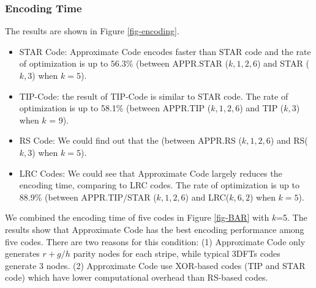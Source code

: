 \documentclass[sigconf]{acmart}
\begin{document}
\subsubsection{Encoding Time}
The results are shown in Figure \ref{fig-encoding}.
\begin{itemize}
    \item STAR Code: Approximate Code encodes faster than STAR code and the rate of optimization is up to $56.3\%$ (between APPR.STAR ($k,1,2,6$) and STAR ($k,3$) when $k = 5$).

    \item TIP-Code: the result of TIP-Code is similar to STAR code. The rate of optimization is up to 58.1\% (between APPR.TIP ($k,1,2,6$) and TIP ($k,3$) when $k$ = 9).

    \item RS Code: We could find out that the  (between APPR.RS ($k,1,2,6$) and RS($k,3$) when $k = 5$).

    \item LRC Codes: We could see that Approximate Code largely reduces the encoding time, comparing to LRC codes. The rate of optimization is up to 88.9\% (between APPR.TIP/STAR ($k,1,2,6$) and LRC($k, 6, 2$) when $k = 5$).
\end{itemize}

We combined the encoding time of five codes in Figure \ref{fig-BAR} with $k$=5. The results show that Approximate Code has the best encoding performance among five codes. There are two reasons for this condition: (1) Approximate Code only generates $r+g/h$ parity nodes for each stripe, while typical 3DFTs codes generate 3 nodes. (2) Approximate Code use XOR-based codes (TIP and STAR code) which have lower computational overhead than RS-based codes.\par
\end{document}
